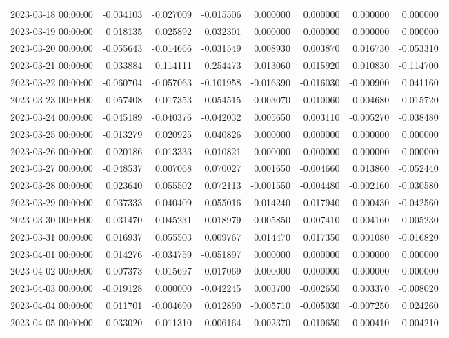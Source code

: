 \begin{tabular}{lrrrrrrr}
2023-03-18 00:00:00 & -0.034103 & -0.027009 & -0.015506 & 0.000000 & 0.000000 & 0.000000 & 0.000000 \\
2023-03-19 00:00:00 & 0.018135 & 0.025892 & 0.032301 & 0.000000 & 0.000000 & 0.000000 & 0.000000 \\
2023-03-20 00:00:00 & -0.055643 & -0.014666 & -0.031549 & 0.008930 & 0.003870 & 0.016730 & -0.053310 \\
2023-03-21 00:00:00 & 0.033884 & 0.114111 & 0.254473 & 0.013060 & 0.015920 & 0.010830 & -0.114700 \\
2023-03-22 00:00:00 & -0.060704 & -0.057063 & -0.101958 & -0.016390 & -0.016030 & -0.000900 & 0.041160 \\
2023-03-23 00:00:00 & 0.057408 & 0.017353 & 0.054515 & 0.003070 & 0.010060 & -0.004680 & 0.015720 \\
2023-03-24 00:00:00 & -0.045189 & -0.040376 & -0.042032 & 0.005650 & 0.003110 & -0.005270 & -0.038480 \\
2023-03-25 00:00:00 & -0.013279 & 0.020925 & 0.040826 & 0.000000 & 0.000000 & 0.000000 & 0.000000 \\
2023-03-26 00:00:00 & 0.020186 & 0.013333 & 0.010821 & 0.000000 & 0.000000 & 0.000000 & 0.000000 \\
2023-03-27 00:00:00 & -0.048537 & 0.007068 & 0.070027 & 0.001650 & -0.004660 & 0.013860 & -0.052440 \\
2023-03-28 00:00:00 & 0.023640 & 0.055502 & 0.072113 & -0.001550 & -0.004480 & -0.002160 & -0.030580 \\
2023-03-29 00:00:00 & 0.037333 & 0.040409 & 0.055016 & 0.014240 & 0.017940 & 0.000430 & -0.042560 \\
2023-03-30 00:00:00 & -0.031470 & 0.045231 & -0.018979 & 0.005850 & 0.007410 & 0.004160 & -0.005230 \\
2023-03-31 00:00:00 & 0.016937 & 0.055503 & 0.009767 & 0.014470 & 0.017350 & 0.001080 & -0.016820 \\
2023-04-01 00:00:00 & 0.014276 & -0.034759 & -0.051897 & 0.000000 & 0.000000 & 0.000000 & 0.000000 \\
2023-04-02 00:00:00 & 0.007373 & -0.015697 & 0.017069 & 0.000000 & 0.000000 & 0.000000 & 0.000000 \\
2023-04-03 00:00:00 & -0.019128 & 0.000000 & -0.042245 & 0.003700 & -0.002650 & 0.003370 & -0.008020 \\
2023-04-04 00:00:00 & 0.011701 & -0.004690 & 0.012890 & -0.005710 & -0.005030 & -0.007250 & 0.024260 \\
2023-04-05 00:00:00 & 0.033020 & 0.011310 & 0.006164 & -0.002370 & -0.010650 & 0.000410 & 0.004210 \\

\end{tabular}
